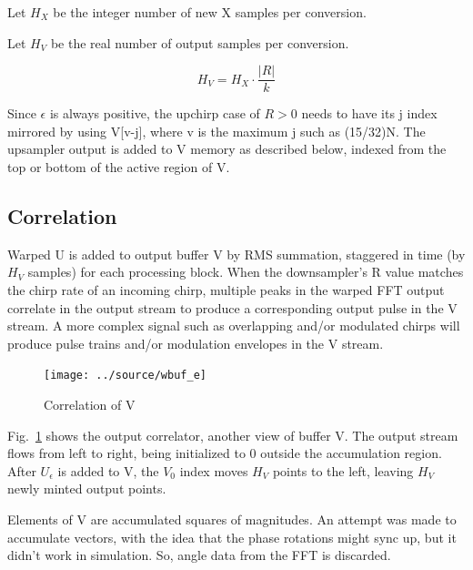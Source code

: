 Let $H_X$ be the integer number of new X samples per conversion.

Let $H_V$ be the real number of output samples per conversion.

\begin{equation}  \label{eq:hv}
H_V = H_X \cdot \frac{|R|}{k}
\end{equation}

Since $\epsilon$ is always positive, the upchirp case of $R>0$ needs to have its
j index mirrored by using V[v-j], where v is the maximum j such as (15/32)N.
The upsampler output is added to V memory as described below, indexed from the
top or bottom of the active region of V.

\subsection{Correlation}

Warped U is added to output buffer V by RMS summation,
staggered in time (by $H_V$ samples) for each processing block.
When the downsampler's R value matches the chirp rate of an incoming chirp,
multiple peaks in the warped FFT output correlate in the output stream to
produce a corresponding output pulse in the V stream.
A more complex signal such as overlapping and/or modulated chirps will produce
pulse trains and/or modulation envelopes in the V stream.

\begin{figure}
    \centering
    \texttt{[image: ../source/wbuf\_e]}
    \caption[W correlation]{Correlation of V}
    \label{fig:wbuf}
\end{figure}

Fig.~\ref{fig:wbuf} shows the output correlator, another view of buffer V.
The output stream flows from left to right,
being initialized to 0 outside the accumulation region.
After $U_\epsilon$ is added to V, the $V_0$ index moves $H_V$ points
to the left, leaving $H_V$ newly minted output points.

Elements of V are accumulated squares of magnitudes.
An attempt was made to accumulate vectors,
with the idea that the phase rotations might sync up,
but it didn't work in simulation.
So, angle data from the FFT is discarded.
